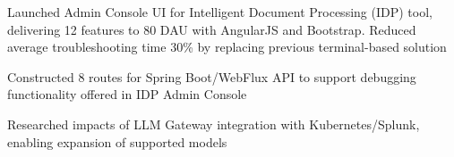 \documentclass[letterpaper,11pt]{article}
\newcommand{\resumeItem}[1]{
  \item\small{
    {#1 \vspace{-1pt}}
  }
}
\begin{document}

        \resumeItem{Launched Admin Console UI for Intelligent Document Processing (IDP) tool, delivering 12 features to 80 DAU with AngularJS and Bootstrap. Reduced average troubleshooting time 30\% by replacing previous terminal-based solution}
    
        
        \resumeItem{Constructed 8 routes for Spring Boot/WebFlux API to support debugging functionality offered in IDP Admin Console}
        
        
        

        
        \resumeItem{Researched impacts of LLM Gateway integration with Kubernetes/Splunk, enabling expansion of supported models}
        
\end{document}
